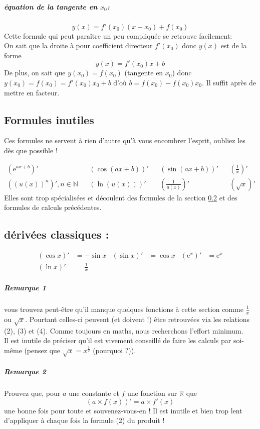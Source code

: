 \documentclass[11pt]{article}
\newcommand{\R}{\mathbb R}
\newcommand{\de}[1]{\left(#1\right)'}
\newcommand{\e}[1]{\mathrm{e}^{#1}}
\begin{document}
        \subparagraph{équation de la tangente en $x_0$:}
        \begin{equation*}
            y(x)=f'(x_0)(x-x_0) +f(x_0) 
        \end{equation*}
        Cette formule qui peut paraître un peu compliquée se retrouve facilement:\\
        On sait que la droite à pour coefficient directeur $f'(x_0)$ donc $y(x)$ est de la forme
        \begin{equation*}
            y(x)=f'(x_0)x+b
        \end{equation*}
        De plus, on sait que $y(x_0)=f(x_0)$ (tangente en $x_0$) donc $y(x_0)=f(x_0)= f'(x_0)x_0 +b$ d'où $b=f(x_0) -f(x_0)x_0$. Il suffit après de mettre en facteur.

        \subsection{Formules inutiles}
        Ces formules ne servent à rien d'autre qu'à vous encombrer l'esprit, oubliez les dès que possible !

        \begin{align*}
            \de{\e{ax+b}} && \de{\cos(ax+b)} && \de{\sin(ax+b)} && \de{\frac{1}{x}}\\
            \de{(u(x))^n}, n\in\mathbb{N} && \de{\ln(u(x))} && \de{\frac{1}{u(x)}} && \de{\sqrt{x}}
        \end{align*}
        Elles sont trop spécialisées et découlent des formules de la section \ref{derClassiques} et des formules de calculs précédentes.

        \subsection{dérivées classiques :} \label{derClassiques}
        \begin{align*}
            \de{\cos{x}} &= -\sin{x} &\de{\sin{x}} &= \cos{x} & \de{\e{x}} &= \e{x} \\
            \de{\ln{x}} &= \frac{1}{x} 
        \end{align*}
        \subparagraph{Remarque 1} vous trouvez peut-être qu'il manque quelques fonctions à cette section comme $\frac{1}{x}$ ou $\sqrt{x}$. Pourtant celles-ci peuvent (et doivent !) être retrouvées via les relations (2), (3) et (4). Comme toujours en maths, nous recherchons l'effort minimum.\\
        Il est inutile de préciser qu'il est vivement conseillé de faire les calculs par soi-même (pensez que $\sqrt{x} = x^{\frac{1}{2}}$ (pourquoi ?)).
        \subparagraph{Remarque 2} Prouvez que, pour $a$ une constante et $f$ une fonction sur $\R$ que
        \begin{equation*}
         \de{a\times f(x)} = a\times f'(x)
        \end{equation*}
         une bonne fois pour toute et souvenez-vous-en ! Il est inutile et bien trop lent d'appliquer à chaque fois la formule (2) du produit !  
\end{document}
